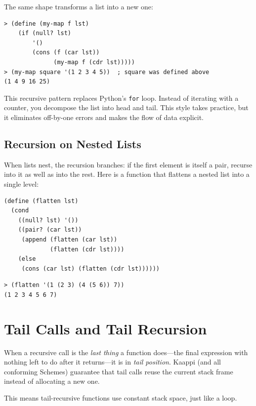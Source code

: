The same shape transforms a list into a new one:

\begin{lstlisting}[style=repl]
> (define (my-map f lst)
    (if (null? lst)
        '()
        (cons (f (car lst))
              (my-map f (cdr lst)))))
> (my-map square '(1 2 3 4 5))  ; square was defined above
(1 4 9 16 25)
\end{lstlisting}

\begin{note}
This recursive pattern replaces Python's \texttt{for} loop. Instead of iterating with a counter, you decompose the list into head and tail. This style takes practice, but it eliminates off-by-one errors and makes the flow of data explicit.
\end{note}

\subsection{Recursion on Nested Lists}

When lists nest, the recursion branches: if the first element is itself a pair, recurse into it as well as into the rest. Here is a function that flattens a nested list into a single level:

\begin{lstlisting}
(define (flatten lst)
  (cond
    ((null? lst) '())
    ((pair? (car lst))
     (append (flatten (car lst))
             (flatten (cdr lst))))
    (else
     (cons (car lst) (flatten (cdr lst))))))
\end{lstlisting}

\begin{lstlisting}[style=repl]
> (flatten '(1 (2 3) (4 (5 6)) 7))
(1 2 3 4 5 6 7)
\end{lstlisting}

\section{Tail Calls and Tail Recursion}

When a recursive call is the \emph{last thing} a function does---the final expression with nothing left to do after it returns---it is in \emph{tail position}. Kaappi (and all conforming Schemes) guarantee that tail calls reuse the current stack frame instead of allocating a new one.

This means tail-recursive functions use constant stack space, just like a loop.

